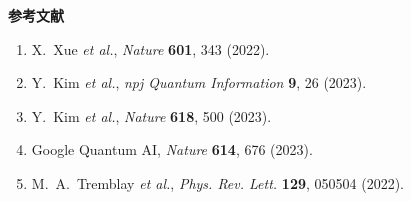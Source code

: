 \documentclass[11pt,a4j,dvipdfmx]{jarticle} 					%
\newcommand{\研究課題名}{誤り耐性量子コンピュータに向けた誤り訂正技術の開発(仮)}
\newcommand{\研究機関名}{東京大学}
\newcommand{\研究代表者氏名}{寺師弘二}
\newcommand{\me}{\underline{\underline{K.~Terashi}}}
\newcommand{\研究期間の最終元号年度}{10}  %
\begin{document}
\vspace*{0.5zw}
\noindent\textbf{参考文献} \vspace{-2mm}
\begin{enumerate}
	\renewcommand{\labelenumi}{[\arabic{enumi}]}

	\item \label{errorRateBenchmark} %
		X.~Xue {\it et al.}, {\it Nature} {\bf 601}, 343 (2022).\vspace{-3mm}
	\item \label{fastReadout} %
		Y.~Kim {\it et al.}, {\it npj Quantum Information} {\bf 9}, 26 (2023).\vspace{-3mm}
	\item \label{IBM_Utility} %
		Y.~Kim {\it et al.}, {\it Nature} {\bf 618}, 500 (2023).\vspace{-3mm}
	\item \label{Google} %
		Google Quantum AI, {\it Nature} {\bf 614}, 676 (2023).\vspace{-3mm}
	\item \label{LDPC2} %
		M.~A.~Tremblay {\it et al.}, {\it Phys. Rev. Lett.} {\bf 129}, 050504 (2022).\vspace{-3mm}

\end{enumerate}
\end{document}
